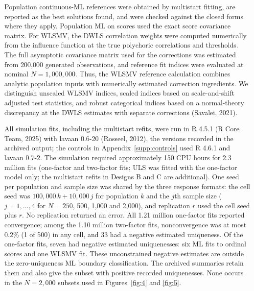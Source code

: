 Population continuous-ML references were obtained by multistart fitting, are reported as the best solutions found, and were checked against the closed forms where they apply. Population ML on scores used the exact score covariance matrix. For WLSMV, the DWLS correlation weights were computed numerically from the influence function at the true polychoric correlations and thresholds. The full asymptotic covariance matrix used for the corrections was estimated from 200,000 generated observations, and reference fit indices were evaluated at nominal $N=1{,}000{,}000$. Thus, the WLSMV reference calculation combines analytic population inputs with numerically estimated correction ingredients. We distinguish unscaled WLSMV indices, scaled indices based on scale-and-shift adjusted test statistics, and robust categorical indices based on a normal-theory discrepancy at the DWLS estimates with separate corrections (Savalei, 2021).

All simulation fits, including the multistart refits, were run in R 4.5.1 (R Core Team, 2025) with lavaan 0.6-20 (Rosseel, 2012), the versions recorded in the archived output; the controls in Appendix~\ref{supp:controls} used R 4.6.1 and lavaan 0.7-2. The simulation required approximately 150 CPU hours for 2.3 million fits (one-factor and two-factor fits; ULS was fitted with the one-factor model only; the multistart refits in Designs B and C are additional). One seed per population and sample size was shared by the three response formats: the cell seed was $100{,}000\,k+10{,}000\,j$ for population $k$ and the $j$th sample size ($j=1,\dots,4$ for $N=250$, 500, 1,000 and 2,000), and replication $r$ used the cell seed plus $r$. No replication returned an error. All 1.21 million one-factor fits reported convergence; among the 1.10 million two-factor fits, nonconvergence was at most 0.2\% (1 of 500) in any cell, and 33 had a negative estimated uniqueness. Of the one-factor fits, seven had negative estimated uniquenesses: six ML fits to ordinal scores and one WLSMV fit. These unconstrained negative estimates are outside the zero-uniqueness ML boundary classification. The archived summaries retain them and also give the subset with positive recorded uniquenesses. None occurs in the $N=2{,}000$ subsets used in Figures~\ref{fig:4} and \ref{fig:5}.


